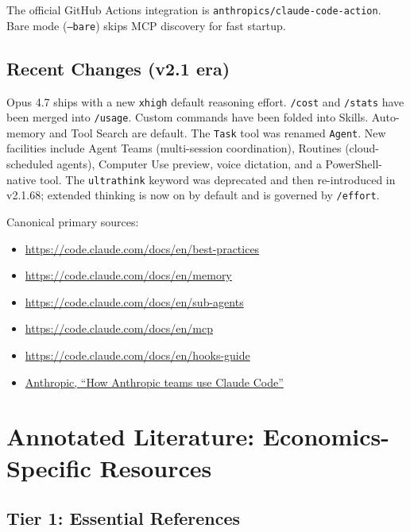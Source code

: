 \documentclass[11pt]{article}
\begin{document}
The official GitHub Actions integration is \texttt{anthropics/claude-code-action}. Bare mode (\texttt{--bare}) skips MCP discovery for fast startup.

\subsection{Recent Changes (v2.1 era)}

Opus 4.7 ships with a new \texttt{xhigh} default reasoning effort. \texttt{/cost} and \texttt{/stats} have been merged into \texttt{/usage}. Custom commands have been folded into Skills. Auto-memory and Tool Search are default. The \texttt{Task} tool was renamed \texttt{Agent}. New facilities include Agent Teams (multi-session coordination), Routines (cloud-scheduled agents), Computer Use preview, voice dictation, and a PowerShell-native tool. The \texttt{ultrathink} keyword was deprecated and then re-introduced in v2.1.68; extended thinking is now on by default and is governed by \texttt{/effort}.

Canonical primary sources:
\begin{itemize}[leftmargin=*,nosep]
    \item \url{https://code.claude.com/docs/en/best-practices}
    \item \url{https://code.claude.com/docs/en/memory}
    \item \url{https://code.claude.com/docs/en/sub-agents}
    \item \url{https://code.claude.com/docs/en/mcp}
    \item \url{https://code.claude.com/docs/en/hooks-guide}
    \item \href{https://www-cdn.anthropic.com/58284b19e702b49db9302d5b6f135ad8871e7658.pdf}{Anthropic, ``How Anthropic teams use Claude Code''}
\end{itemize}

\section{Annotated Literature: Economics-Specific Resources}\label{sec:literature}

\subsection{Tier 1: Essential References}
\end{document}
